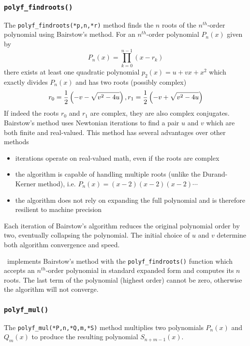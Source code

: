 \subsubsection{{\tt polyf\_findroots()}}
\label{module:math:poly:polyf_findroots}
The {\tt polyf\_findroots(*p,n,*r)} method
finds the $n$ roots of the $n^{th}$-order polynomial using Bairstow's
method.
For an $n^{th}$-order polynomial $P_n(x)$ given by
%
\begin{equation}
\label{eqn:math:poly:roots}
    P_n(x) = \prod_{k=0}^{n-1}{(x-r_k)}
\end{equation}
%
there exists at least one quadratic polynomial $p_{2}(x)=u + vx + x^2$ which
exactly divides $P_{n}(x)$ and has two roots (possibly complex)
%
\begin{equation}
\label{eqn:math:poly:complex_roots}
    r_0 = \frac{1}{2}\left(-v-\sqrt{v^2-4u}\right), \; \\
    r_1 = \frac{1}{2}\left(-v+\sqrt{v^2-4u}\right)
\end{equation}
%
If indeed the roots $r_0$ and $r_1$ are complex, they are also complex
conjugates.
Bairstow's method uses Newtonian iterations to find a pair $u$ and $v$ which
are both finite and real-valued.
This method has several advantages over other methods
\begin{itemize}
\item iterations operate on real-valued math, even if the roots are complex
\item the algorithm is capable of handling multiple roots (unlike the
      Durand-Kerner method), i.e. $P_{n}(x) = (x-2)(x-2)(x-2)\cdots$
\item the algorithm does not rely on expanding the full polynomial and is
      therefore resilient to machine precision
\end{itemize}
Each iteration of Bairstow's algorithm reduces the original polynomial order
by two, eventually collapsing the polynomial.
The initial choice of $u$ and $v$ determine both algorithm convergence and
speed.

\liquid\ implements Bairstow's method with the {\tt polyf\_findroots()}
function which accepts an $n^{th}$-order polynomial in standard expanded form
and computes its $n$ roots.
The last term of the polynomial (highest order) cannot be zero, otherwise the
algorithm will not converge.


\subsubsection{{\tt polyf\_mul()}}
\label{module:math:poly:polyf_mul}
The {\tt polyf\_mul(*P,n,*Q,m,*S)} method
multiplies two polynomials $P_n(x)$ and $Q_m(x)$ to produce the
resulting polynomial $S_{n+m-1}(x)$.

